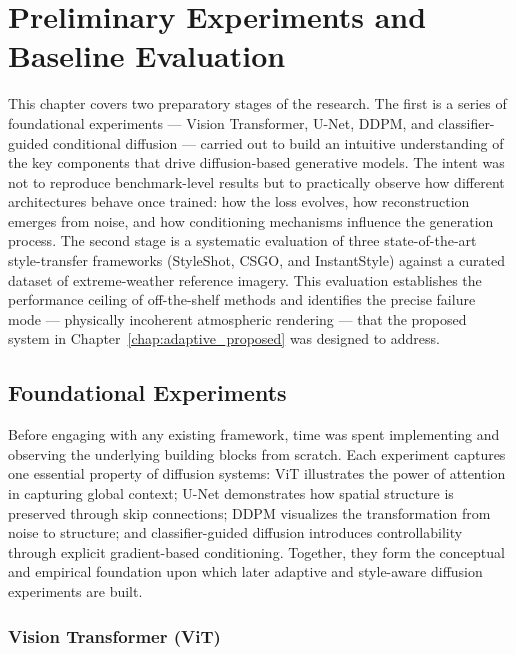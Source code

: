 \chapter{Preliminary Experiments and Baseline Evaluation}
\label{chap:foundations_existing}

This chapter covers two preparatory stages of the research.
The first is a series of foundational experiments --- Vision Transformer, U-Net, DDPM, and classifier-guided conditional diffusion --- carried out to build an intuitive understanding of the key components that drive diffusion-based generative models.
The intent was not to reproduce benchmark-level results but to practically observe how different architectures behave once trained: how the loss evolves, how reconstruction emerges from noise, and how conditioning mechanisms influence the generation process.
The second stage is a systematic evaluation of three state-of-the-art style-transfer frameworks (StyleShot, CSGO, and InstantStyle) against a curated dataset of extreme-weather reference imagery.
This evaluation establishes the performance ceiling of off-the-shelf methods and identifies the precise failure mode --- physically incoherent atmospheric rendering --- that the proposed system in Chapter~\ref{chap:adaptive_proposed} was designed to address.

\section{Foundational Experiments}
\label{sec:foundations}

\noindent Before engaging with any existing framework, time was spent implementing and observing the underlying building blocks from scratch.
Each experiment captures one essential property of diffusion systems: ViT illustrates the power of attention in capturing global context; U-Net demonstrates how spatial structure is preserved through skip connections; DDPM visualizes the transformation from noise to structure; and classifier-guided diffusion introduces controllability through explicit gradient-based conditioning.
Together, they form the conceptual and empirical foundation upon which later adaptive and style-aware diffusion experiments are built.

\subsection{Vision Transformer (ViT)}
\label{sec:vit}

